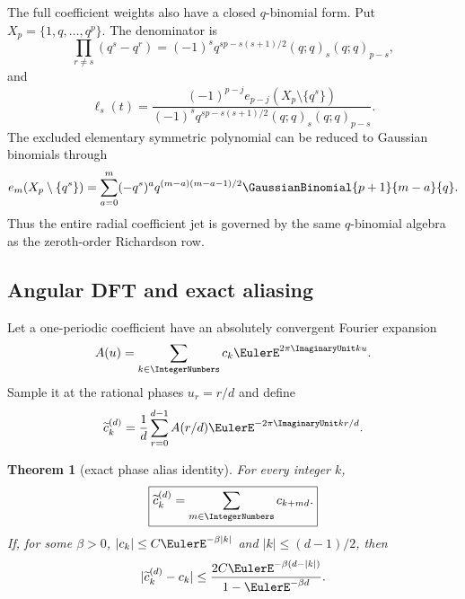 \documentclass[11pt]{article}
\numberwithin{equation}{section}
\newtheorem{theorem}{Theorem}[section]
\theoremstyle{definition}
\theoremstyle{remark}
\begin{document}
The full coefficient weights also have a closed $q$-binomial form.  Put
$X_p=\{1,q,\ldots,q^p\}$.  The denominator is
\begin{equation}
 \prod_{r\ne s}(q^s-q^r)
 =(-1)^sq^{sp-s(s+1)/2}(q;q)_s(q;q)_{p-s},
 \label{p6:eq:lagrange-denominator}
\end{equation}
and
\begin{equation}
 [t^j]\ell_s(t)
 =\frac{(-1)^{p-j}e_{p-j}(X_p\setminus\{q^s\})}
 {(-1)^sq^{sp-s(s+1)/2}(q;q)_s(q;q)_{p-s}}.
 \label{p6:eq:jet-q-weights}
\end{equation}
The excluded elementary symmetric polynomial can be reduced to Gaussian binomials through
\begin{equation}
 e_m(X_p\setminus\{q^s\})
 =\sum_{a=0}^{m}(-q^s)^a
 q^{(m-a)(m-a-1)/2}\GaussianBinomial{p+1}{m-a}{q}.
 \label{p6:eq:excluded-e-qbinom}
\end{equation}
Thus the entire radial coefficient jet is governed by the same $q$-binomial algebra as the
zeroth-order Richardson row.

\subsection{Angular DFT and exact aliasing}

Let a one-periodic coefficient have an absolutely convergent Fourier expansion
\begin{equation}
 A(u)=\sum_{k\in\IntegerNumbers}c_k\EulerE^{2\pi\ImaginaryUnit ku}.
 \label{p6:eq:A-fourier}
\end{equation}
Sample it at the rational phases $u_r=r/d$ and define
\begin{equation}
 \widetilde c_k^{(d)}
 =\frac1d\sum_{r=0}^{d-1}A(r/d)\EulerE^{-2\pi\ImaginaryUnit kr/d}.
 \label{p6:eq:dft-estimator}
\end{equation}

\begin{theorem}[exact phase alias identity]
\label{p6:thm:phase-alias}
For every integer $k$,
\begin{equation}
 \boxed{\displaystyle
 \widetilde c_k^{(d)}=\sum_{m\in\IntegerNumbers}c_{k+md}.}
 \label{p6:eq:phase-alias}
\end{equation}
If, for some $\beta>0$, $|c_k|\le C\EulerE^{-\beta|k|}$ and
$|k|\le(d-1)/2$, then
\begin{equation}
 |\widetilde c_k^{(d)}-c_k|
 \le\frac{2C\EulerE^{-\beta(d-|k|)}}{1-\EulerE^{-\beta d}}.
 \label{p6:eq:alias-bound}
\end{equation}
\end{theorem}
\end{document}
